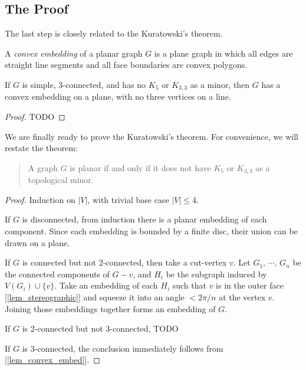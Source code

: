     \subsection{The Proof}
    
        The last step is closely related to the Kuratowski's theorem.
    
        \begin{defn} \label{def_convex_embed}
            A \emph{convex embedding} of a planar graph $G$ is a plane graph in which all edges are straight line segments and all face boundaries are convex polygons.
        \end{defn}
        
        \begin{lemma} \label{lem_convex_embed}
            If $G$ is simple, 3-connected, and has no $K_5$ or $K_{3,3}$ as a minor, then $G$ has a convex embedding on a plane, with no three vertices on a line.
        \end{lemma}
        
        \begin{proof}
            TODO
        \end{proof}
        
        We are finally ready to prove the Kuratowski's theorem. For convenience, we will restate the theorem:
        
        \begin{quote}
            A graph $G$ is planar if and only if it does not have $K_5$ or $K_{3,3}$ as a topological minor.
        \end{quote}
        
        \begin{proof}
            Induction on $|V|$, with trivial base case $|V| \leq 4$.
            
            If $G$ is disconnected, from induction there is a planar embedding of each component. Since each embedding is bounded by a finite disc, their union can be drawn on a plane.
            
            If $G$ is connected but not 2-connected, then take a cut-vertex $v$. Let $G_1$, $\cdots$, $G_n$ be the connected components of $G-v$, and $H_i$ be the subgraph induced by $V(G_i) \cup \{v\}$. Take an embedding of each $H_i$ such that $v$ is in the outer face [\ref{lem_stereographic}] and squeeze it into an angle $< 2\pi / n$ at the vertex $v$. Joining those embeddings together forms an embedding of $G$.
            
            If $G$ is 2-connected but not 3-connected, TODO
            
            If $G$ is 3-connected, the conclusion immediately follows from [\ref{lem_convex_embed}].
        \end{proof}
    
